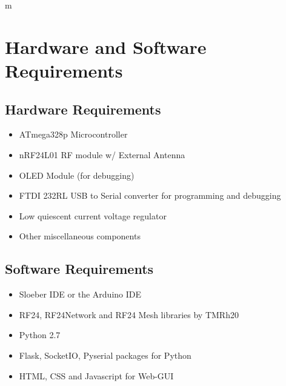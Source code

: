 m\chapter{Hardware and Software Requirements}

\section{Hardware Requirements}
\begin{itemize}
\item ATmega328p Microcontroller
\item nRF24L01 RF module w/ External Antenna
\item OLED Module (for debugging)
\item FTDI 232RL USB to Serial converter for programming and debugging
\item Low quiescent current voltage regulator
\item Other miscellaneous components
\end{itemize}

\section{Software Requirements}
\begin{itemize}
	\item Sloeber IDE or the Arduino IDE 
	\item RF24, RF24Network and RF24 Mesh libraries by TMRh20
	\item Python 2.7
	\item Flask, SocketIO, Pyserial packages for Python
	\item HTML, CSS and Javascript for Web-GUI
\end{itemize}